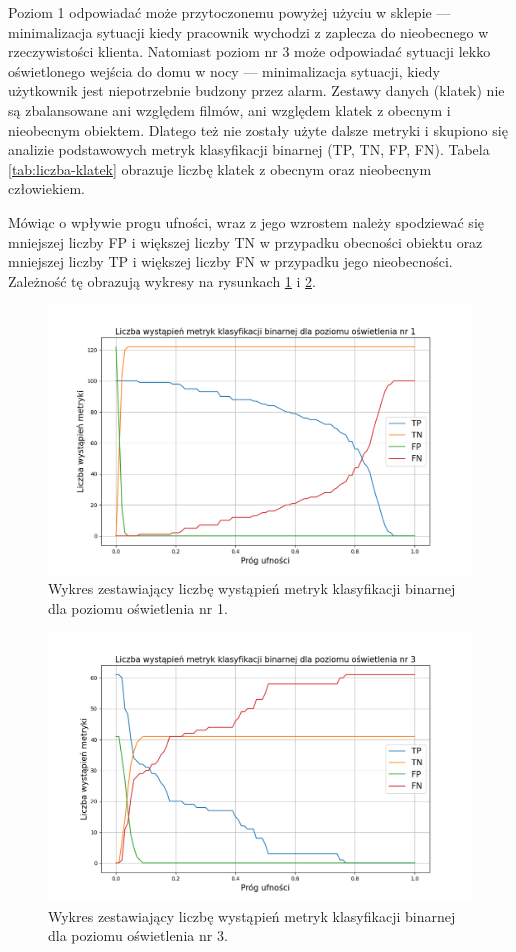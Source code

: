 Poziom 1 odpowiadać może przytoczonemu powyżej użyciu w sklepie --- minimalizacja sytuacji kiedy pracownik wychodzi z zaplecza do nieobecnego w rzeczywistości klienta.
Natomiast poziom nr 3 może odpowiadać sytuacji lekko oświetlonego wejścia do domu w nocy --- minimalizacja sytuacji, kiedy użytkownik jest niepotrzebnie budzony przez alarm. Zestawy danych (klatek) nie są zbalansowane ani względem filmów, ani względem klatek z obecnym i nieobecnym obiektem. Dlatego też nie zostały użyte dalsze metryki i skupiono się analizie podstawowych metryk klasyfikacji binarnej (TP, TN, FP, FN). 
Tabela \ref{tab:liczba-klatek} obrazuje liczbę klatek z obecnym oraz nieobecnym człowiekiem.


Mówiąc o wpływie progu ufności, wraz z jego wzrostem należy spodziewać się mniejszej liczby FP i większej liczby TN w przypadku obecności obiektu oraz mniejszej liczby TP i większej liczby FN  w przypadku jego nieobecności. Zależność tę obrazują wykresy na rysunkach \ref{fig:binary-1} i \ref{fig:binary-3}.
\begin{figure}[H]
    \centering
    \includegraphics[width=\linewidth]{r_test_dokładności/binary_charts/1.png}
    \caption{Wykres zestawiający liczbę wystąpień metryk klasyfikacji binarnej dla poziomu oświetlenia nr 1.}
    \label{fig:binary-1}
\end{figure}
\begin{figure}[H]
    \centering
    \includegraphics[width=\linewidth]{r_test_dokładności/binary_charts/3.png}
    \caption{Wykres zestawiający liczbę wystąpień metryk klasyfikacji binarnej dla poziomu oświetlenia nr 3.}
    \label{fig:binary-3}
\end{figure}
